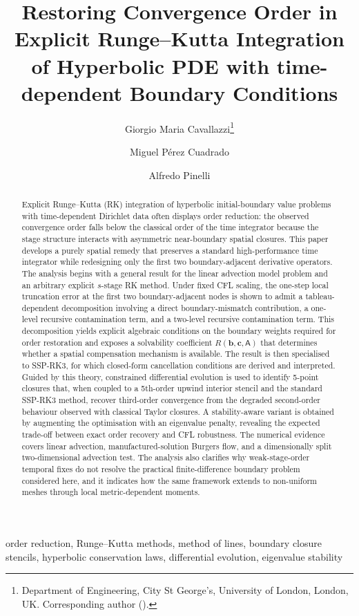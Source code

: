 \documentclass[review,hidelinks,onefignum,onetabnum]{siamart251216}
\title{Restoring Convergence Order in Explicit Runge--Kutta Integration of Hyperbolic PDE with time-dependent Boundary Conditions}
\author{Giorgio Maria Cavallazzi\thanks{Department of Engineering,
  City St George's, University of London, London, UK.
  Corresponding author (\email{giorgio.cavallazzi@city.ac.uk}).}
\and
Miguel P\'erez Cuadrado\footnotemark[1]
\and
Alfredo Pinelli\footnotemark[1]}
\begin{document}
\maketitle

\begin{abstract}
Explicit Runge--Kutta (RK) integration of hyperbolic initial-boundary value problems with time-dependent Dirichlet data often displays order reduction: the observed convergence order falls below the classical order of the time integrator because the stage structure interacts with asymmetric near-boundary spatial closures. This paper develops a purely spatial remedy that preserves a standard high-performance time integrator while redesigning only the first two boundary-adjacent derivative operators. The analysis begins with a general result for the linear advection model problem and an arbitrary explicit $s$-stage RK method. Under fixed CFL scaling, the one-step local truncation error at the first two boundary-adjacent nodes is shown to admit a tableau-dependent decomposition involving a direct boundary-mismatch contribution, a one-level recursive contamination term, and a two-level recursive contamination term. This decomposition yields explicit algebraic conditions on the boundary weights required for order restoration and exposes a solvability coefficient $R(\mathbf b,\mathbf c,\mathsf A)$ that determines whether a spatial compensation mechanism is available. The result is then specialised to SSP-RK3, for which closed-form cancellation conditions are derived and interpreted. Guided by this theory, constrained differential evolution is used to identify 5-point closures that, when coupled to a 5th-order upwind interior stencil and the standard SSP-RK3 method, recover third-order convergence from the degraded second-order behaviour observed with classical Taylor closures. A stability-aware variant is obtained by augmenting the optimisation with an eigenvalue penalty, revealing the expected trade-off between exact order recovery and CFL robustness. The numerical evidence covers linear advection, manufactured-solution Burgers flow, and a dimensionally split two-dimensional advection test. The analysis also clarifies why weak-stage-order temporal fixes do not resolve the practical finite-difference boundary problem considered here, and it indicates how the same framework extends to non-uniform meshes through local metric-dependent moments.
\end{abstract}

\begin{keywords}
order reduction, Runge--Kutta methods, method of lines, boundary closure stencils,
hyperbolic conservation laws, differential evolution, eigenvalue stability
\end{keywords}
\end{document}
